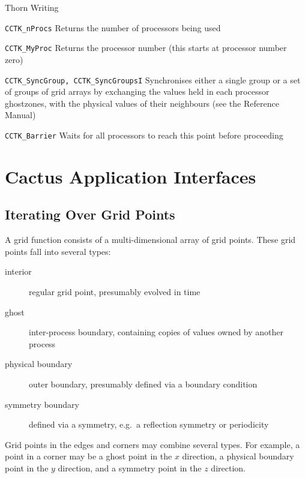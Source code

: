 \begin{cactuspart}{Thorn Writing}
\begin{Lentry}
\item[\texttt{CCTK\_nProcs}] Returns the number of processors being used
\item[\texttt{CCTK\_MyProc}] Returns the processor number (this starts at
  processor number zero)
\item[\texttt{CCTK\_SyncGroup, CCTK\_SyncGroupsI}] Synchronises either a single
  group or a set of groups of grid arrays by
  exchanging the values held in each processor ghostzones, with the
  physical values of their neighbours (see the Reference Manual)
\item[\texttt{CCTK\_Barrier}] Waits for all processors to reach this point
  before proceeding
\end{Lentry}


\section{Cactus Application Interfaces}


\subsection{Iterating Over Grid Points}
\label{sec:CactusAPI.gridpoints}

A grid function consists of a multi-dimensional array of grid points.
These grid points fall into several types:
\begin{description}
\item[interior] regular grid point, presumably evolved in time
\item[ghost] inter-process boundary, containing copies of values owned
  by another process
\item[physical boundary] outer boundary, presumably defined via a
  boundary condition
\item[symmetry boundary] defined via a symmetry, e.g.\ a reflection
  symmetry or periodicity
\end{description}
Grid points in the edges and corners may combine several types. For
example, a point in a corner may be a ghost point in the $x$
direction, a physical boundary point in the $y$ direction, and a
symmetry point in the $z$ direction.


\end{cactuspart}
